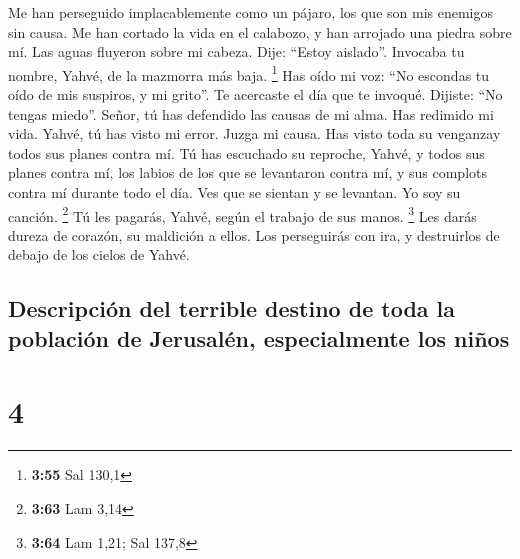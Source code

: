  Me han perseguido implacablemente como un pájaro, los
que son mis enemigos sin causa.  Me han cortado la vida
en el calabozo, y han arrojado una piedra sobre mí.  Las
aguas fluyeron sobre mi cabeza. Dije: ``Estoy aislado''. 
Invocaba tu nombre, Yahvé, de la mazmorra más baja. \footnote{\textbf{3:55}
  Sal 130,1}  Has oído mi voz: ``No escondas tu oído de
mis suspiros, y mi grito''.  Te acercaste el día que te
invoqué. Dijiste: ``No tengas miedo''.  Señor, tú has
defendido las causas de mi alma. Has redimido mi vida. 
Yahvé, tú has visto mi error. Juzga mi causa.  Has visto
toda su venganzay todos sus planes contra mí.  Tú has
escuchado su reproche, Yahvé, y todos sus planes contra mí,
 los labios de los que se levantaron contra mí, y sus
complots contra mí durante todo el día.  Ves que se
sientan y se levantan. Yo soy su canción. \footnote{\textbf{3:63} Lam
  3,14}  Tú les pagarás, Yahvé, según el trabajo de sus
manos. \footnote{\textbf{3:64} Lam 1,21; Sal 137,8}  Les
darás dureza de corazón, su maldición a ellos.  Los
perseguirás con ira, y destruirlos de debajo de los cielos de Yahvé.

\hypertarget{descripciuxf3n-del-terrible-destino-de-toda-la-poblaciuxf3n-de-jerusaluxe9n-especialmente-los-niuxf1os}{%
\subsection{Descripción del terrible destino de toda la población de
Jerusalén, especialmente los
niños}\label{descripciuxf3n-del-terrible-destino-de-toda-la-poblaciuxf3n-de-jerusaluxe9n-especialmente-los-niuxf1os}}

\hypertarget{section-3}{%
\section{4}\label{section-3}}

